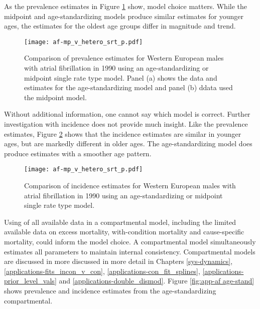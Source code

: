 As the prevalence estimates in Figure \ref{fig:app-af srt p} show, model
choice matters.  While the midpoint and age-standardizing models produce
similar estimates for younger ages, the estimates for the oldest age groups
differ in magnitude and trend.

    \begin{figure}[h]
        \begin{center}
            \texttt{[image: af-mp\_v\_hetero\_srt\_p.pdf]}
            \caption{Comparison of prevalence estimates for Western European
              males with atrial fibrillation in 1990 using an age-standardizing
              or midpoint single rate type model.  Panel (a) shows the data and
              estimates for the age-standardizing model and panel (b)
              ddata used the midpoint model.}
            \label{fig:app-af srt p}
        \end{center}
    \end{figure}

Without additional information, one cannot say which model is correct.
Further investigation with incidence does not provide much insight.  Like
the prevalence estimates, Figure \ref{fig:app-af srt i} shows that the
incidence estimates are similar in younger ages, but are markedly different
in older ages.  The age-standardizing model does produce estimates with a
smoother age pattern.

    \begin{figure}[h]
        \begin{center}
            \texttt{[image: af-mp\_v\_hetero\_srt\_p.pdf]}
            \caption{Comparison of incidence estimates for Western European
              males with atrial fibrillation in 1990 using an age-standardizing
              or midpoint single rate type model.}
            \label{fig:app-af srt i}
        \end{center}
    \end{figure}

Using of all available data in a compartmental model, including the
limited available data on excess mortality, with-condition mortality
and cause-specific mortality, could inform the model choice.
A compartmental model simultaneously estimates all parameters to
maintain internal consistency.  Compartmental models are discussed
in more discussed in more detail in Chapters \ref{sys-dynamics},
\ref{applications-fits_incon_v_con}, \ref{applications-con_fit_splines},
\ref{applications-prior_level_vals} and \ref{applications-double_dismod}.
Figure \ref{fig:app-af age-stand} shows prevalence and incidence estimates
from the age-standardizing compartmental.

